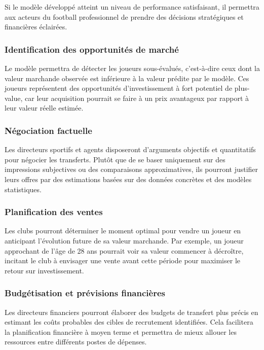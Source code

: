 \documentclass[12pt,a4paper]{article}
\begin{document}
Si le modèle développé atteint un niveau de performance satisfaisant, il permettra aux acteurs du football professionnel de prendre des décisions stratégiques et financières éclairées.

\subsubsection{Identification des opportunités de marché}

Le modèle permettra de détecter les joueurs sous-évalués, c'est-à-dire ceux dont la valeur marchande observée est inférieure à la valeur prédite par le modèle. Ces joueurs représentent des opportunités d'investissement à fort potentiel de plus-value, car leur acquisition pourrait se faire à un prix avantageux par rapport à leur valeur réelle estimée.

\subsubsection{Négociation factuelle}

Les directeurs sportifs et agents disposeront d'arguments objectifs et quantitatifs pour négocier les transferts. Plutôt que de se baser uniquement sur des impressions subjectives ou des comparaisons approximatives, ils pourront justifier leurs offres par des estimations basées sur des données concrètes et des modèles statistiques.

\subsubsection{Planification des ventes}

Les clubs pourront déterminer le moment optimal pour vendre un joueur en anticipant l'évolution future de sa valeur marchande. Par exemple, un joueur approchant de l'âge de 28 ans pourrait voir sa valeur commencer à décroître, incitant le club à envisager une vente avant cette période pour maximiser le retour sur investissement.

\subsubsection{Budgétisation et prévisions financières}

Les directeurs financiers pourront élaborer des budgets de transfert plus précis en estimant les coûts probables des cibles de recrutement identifiées. Cela facilitera la planification financière à moyen terme et permettra de mieux allouer les ressources entre différents postes de dépenses.
\end{document}
